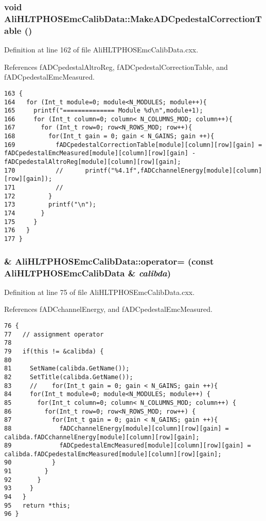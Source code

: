 \subsubsection{\setlength{\rightskip}{0pt plus 5cm}void Ali\-HLTPHOSEmc\-Calib\-Data::Make\-ADCpedestal\-Correction\-Table ()}\label{classAliHLTPHOSEmcCalibData_a11}




Definition at line 162 of file Ali\-HLTPHOSEmc\-Calib\-Data.cxx.

References f\-ADCpedestal\-Altro\-Reg, f\-ADCpedestal\-Correction\-Table, and f\-ADCpedestal\-Emc\-Measured.

\footnotesize\begin{verbatim}163 {
164   for (Int_t module=0; module<N_MODULES; module++){
165     printf("============== Module %d\n",module+1);
166     for (Int_t column=0; column< N_COLUMNS_MOD; column++){
167       for (Int_t row=0; row<N_ROWS_MOD; row++){
168         for(Int_t gain = 0; gain < N_GAINS; gain ++){ 
169           fADCpedestalCorrectionTable[module][column][row][gain] = fADCpedestalEmcMeasured[module][column][row][gain] - fADCpedestalAltroReg[module][column][row][gain];
170           //      printf("%4.1f",fADCchannelEnergy[module][column][row][gain]);
171           //
172         }
173         printf("\n");
174       }
175     }
176   }    
177 }
\end{verbatim}\normalsize 


\subsubsection{ \& Ali\-HLTPHOSEmc\-Calib\-Data::operator= (const {\bf Ali\-HLTPHOSEmc\-Calib\-Data} \& {\em calibda})}\label{classAliHLTPHOSEmcCalibData_a3}




Definition at line 75 of file Ali\-HLTPHOSEmc\-Calib\-Data.cxx.

References f\-ADCchannel\-Energy, and f\-ADCpedestal\-Emc\-Measured.

\footnotesize\begin{verbatim}76 {
77   // assignment operator
78 
79   if(this != &calibda) { 
80 
81     SetName(calibda.GetName());
82     SetTitle(calibda.GetName());
83     //    for(Int_t gain = 0; gain < N_GAINS; gain ++){
84     for(Int_t module=0; module<N_MODULES; module++) {
85       for(Int_t column=0; column< N_COLUMNS_MOD; column++) {
86         for(Int_t row=0; row<N_ROWS_MOD; row++) {
87           for(Int_t gain = 0; gain < N_GAINS; gain ++){
88             fADCchannelEnergy[module][column][row][gain] = calibda.fADCchannelEnergy[module][column][row][gain];
89             fADCpedestalEmcMeasured[module][column][row][gain] = calibda.fADCpedestalEmcMeasured[module][column][row][gain];
90           }
91         }
92       }
93     }
94   }
95   return *this;
96 }
\end{verbatim}\normalsize 


